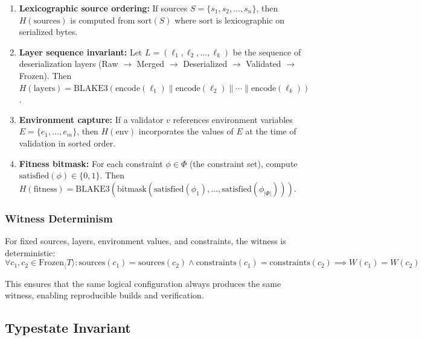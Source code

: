\documentclass[11pt]{article}
\begin{document}
\begin{enumerate}
  \item \textbf{Lexicographic source ordering:} If sources $S = \{s_1, s_2, \ldots, s_n\}$, then $H(\text{sources})$ is computed from $\text{sort}(S)$ where $\text{sort}$ is lexicographic on serialized bytes.

  \item \textbf{Layer sequence invariant:} Let $L = (\ell_1, \ell_2, \ldots, \ell_k)$ be the sequence of deserialization layers (Raw $\to$ Merged $\to$ Deserialized $\to$ Validated $\to$ Frozen). Then $H(\text{layers}) = \text{BLAKE3}(\text{encode}(\ell_1) \mathbin{\|} \text{encode}(\ell_2) \mathbin{\|} \cdots \mathbin{\|} \text{encode}(\ell_k))$.

  \item \textbf{Environment capture:} If a validator $v$ references environment variables $E = \{e_1, \ldots, e_m\}$, then $H(\text{env})$ incorporates the values of $E$ at the time of validation in sorted order.

  \item \textbf{Fitness bitmask:} For each constraint $\phi \in \Phi$ (the constraint set), compute $\text{satisfied}(\phi) \in \{0, 1\}$. Then $H(\text{fitness}) = \text{BLAKE3}(\text{bitmask}(\text{satisfied}(\phi_1), \ldots, \text{satisfied}(\phi_|\Phi|)))$.
\end{enumerate}

\subsubsection{Witness Determinism}

\begin{lemma}
For fixed sources, layers, environment values, and constraints, the witness is deterministic:
\begin{equation}
\forall c_1, c_2 \in \text{Frozen}_\langle T \rangle : \text{sources}(c_1) = \text{sources}(c_2) \land \text{constraints}(c_1) = \text{constraints}(c_2) \implies W(c_1) = W(c_2)
\end{equation}
\end{lemma}

\noindent This ensures that the same logical configuration always produces the same witness, enabling reproducible builds and verification.

\subsection{Typestate Invariant}
\end{document}
